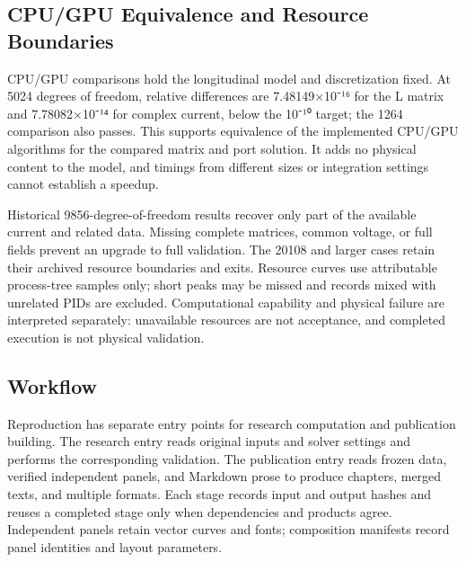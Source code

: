 \documentclass[journal,10pt]{IEEEtran}
\begin{document}
\subsection*{CPU/GPU Equivalence and Resource Boundaries}
\hypertarget{10.compute.heading}{}
CPU/GPU comparisons hold the longitudinal model and discretization fixed. At 5024 degrees of freedom, relative differences are 7.48149×10⁻¹⁶ for the L matrix and 7.78082×10⁻¹⁴ for complex current, below the 10⁻¹⁰ target; the 1264 comparison also passes. This supports equivalence of the implemented CPU/GPU algorithms for the compared matrix and port solution. It adds no physical content to the model, and timings from different sizes or integration settings cannot establish a speedup.


Historical 9856-degree-of-freedom results recover only part of the available current and related data. Missing complete matrices, common voltage, or full fields prevent an upgrade to full validation. The 20108 and larger cases retain their archived resource boundaries and exits. Resource curves use attributable process-tree samples only; short peaks may be missed and records mixed with unrelated PIDs are excluded. Computational capability and physical failure are interpreted separately: unavailable resources are not acceptance, and completed execution is not physical validation.


\subsection*{Workflow}
\hypertarget{10.workflow.heading}{}
Reproduction has separate entry points for research computation and publication building. The research entry reads original inputs and solver settings and performs the corresponding validation. The publication entry reads frozen data, verified independent panels, and Markdown prose to produce chapters, merged texts, and multiple formats. Each stage records input and output hashes and reuses a completed stage only when dependencies and products agree. Independent panels retain vector curves and fonts; composition manifests record panel identities and layout parameters.
\end{document}
